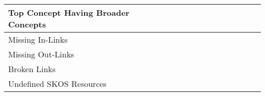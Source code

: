 \begin{table}[h]
\begin{tabular}{p{4cm}ccccccccccccccc}
Top Concept Having Broader Concepts &&&&&&&&&&&&&&& \\

\midrule

Missing In-Links &&&&&&&&&&&&&&& \\

Missing Out-Links &&&&&&&&&&&&&&& \\

Broken Links &&&&&&&&&&&&&&& \\

\midrule

Undefined SKOS Resources &&&&&&&&&&&&&&& \\

\bottomrule
\end{tabular}
\end{table}


% 

